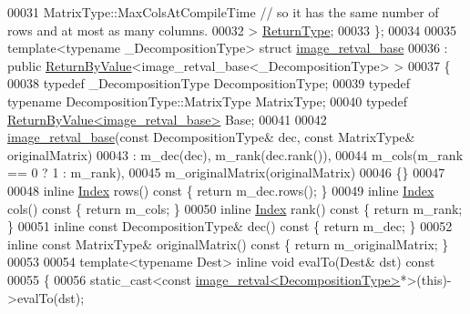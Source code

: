 \begin{DoxyCode}
00031     MatrixType::MaxColsAtCompileTime  \textcolor{comment}{// so it has the same number of rows and at most as many columns.}
00032   > \hyperlink{group___core___module_class_eigen_1_1_matrix}{ReturnType};
00033 \};
00034 
00035 \textcolor{keyword}{template}<\textcolor{keyword}{typename} \_DecompositionType> \textcolor{keyword}{struct }\hyperlink{struct_eigen_1_1internal_1_1image__retval__base}{image\_retval\_base}
00036  : \textcolor{keyword}{public} \hyperlink{group___core___module_class_eigen_1_1_return_by_value}{ReturnByValue}<image\_retval\_base<\_DecompositionType> >
00037 \{
00038   \textcolor{keyword}{typedef} \_DecompositionType DecompositionType;
00039   \textcolor{keyword}{typedef} \textcolor{keyword}{typename} DecompositionType::MatrixType MatrixType;
00040   \textcolor{keyword}{typedef} \hyperlink{group___core___module_class_eigen_1_1_return_by_value}{ReturnByValue<image\_retval\_base>} Base;
00041 
00042   \hyperlink{struct_eigen_1_1internal_1_1image__retval__base}{image\_retval\_base}(\textcolor{keyword}{const} DecompositionType& dec, \textcolor{keyword}{const} MatrixType& originalMatrix)
00043     : m\_dec(dec), m\_rank(dec.rank()),
00044       m\_cols(m\_rank == 0 ? 1 : m\_rank),
00045       m\_originalMatrix(originalMatrix)
00046   \{\}
00047 
00048   \textcolor{keyword}{inline} \hyperlink{namespace_eigen_a62e77e0933482dafde8fe197d9a2cfde}{Index} rows()\textcolor{keyword}{ const }\{ \textcolor{keywordflow}{return} m\_dec.rows(); \}
00049   \textcolor{keyword}{inline} \hyperlink{namespace_eigen_a62e77e0933482dafde8fe197d9a2cfde}{Index} cols()\textcolor{keyword}{ const }\{ \textcolor{keywordflow}{return} m\_cols; \}
00050   \textcolor{keyword}{inline} \hyperlink{namespace_eigen_a62e77e0933482dafde8fe197d9a2cfde}{Index} rank()\textcolor{keyword}{ const }\{ \textcolor{keywordflow}{return} m\_rank; \}
00051   \textcolor{keyword}{inline} \textcolor{keyword}{const} DecompositionType& dec()\textcolor{keyword}{ const }\{ \textcolor{keywordflow}{return} m\_dec; \}
00052   \textcolor{keyword}{inline} \textcolor{keyword}{const} MatrixType& originalMatrix()\textcolor{keyword}{ const }\{ \textcolor{keywordflow}{return} m\_originalMatrix; \}
00053 
00054   \textcolor{keyword}{template}<\textcolor{keyword}{typename} Dest> \textcolor{keyword}{inline} \textcolor{keywordtype}{void} evalTo(Dest& dst)\textcolor{keyword}{ const}
00055 \textcolor{keyword}{  }\{
00056     \textcolor{keyword}{static\_cast<}\textcolor{keyword}{const }\hyperlink{struct_eigen_1_1internal_1_1image__retval}{image\_retval<DecompositionType>}*\textcolor{keyword}{>}(\textcolor{keyword}{this})->evalTo(dst);

\end{DoxyCode}

